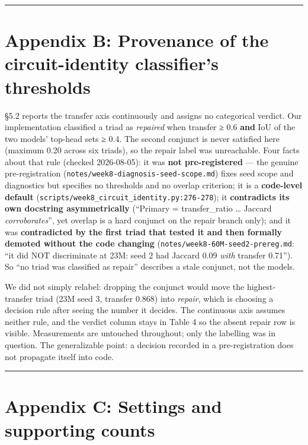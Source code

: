 \documentclass[11pt]{article}
\begin{document}
\begin{center}\rule{0.5\linewidth}{0.5pt}\end{center}

\section{Appendix B: Provenance of the circuit-identity classifier's thresholds}\label{appendix-b-provenance-of-the-circuit-identity-classifiers-thresholds}

§5.2 reports the transfer axis continuously and assigns no categorical verdict. Our
implementation classified a triad as \emph{repaired} when transfer ≥ 0.6 \textbf{and} IoU of the two
models' top-head sets ≥ 0.4. The second conjunct is never satisfied here (maximum 0.20
across six triads), so the repair label was unreachable. Four facts about that rule
(checked 2026-08-05): it was \textbf{not pre-registered} — the genuine pre-registration
(\texttt{notes/week8-diagnosis-seed-scope.md}) fixes seed scope and diagnostics but specifies no
thresholds and no overlap criterion; it is a \textbf{code-level default}
(\texttt{scripts/week8\_circuit\_identity.py:276-278}); it \textbf{contradicts its own docstring
asymmetrically} (``Primary = transfer\_ratio \ldots{} Jaccard \emph{corroborates}'', yet overlap is a
hard conjunct on the repair branch only); and it was \textbf{contradicted by the first triad that
tested it and then formally demoted without the code changing}
(\texttt{notes/week8-60M-seed2-prereg.md}: ``it did NOT discriminate at 23M: seed 2 had Jaccard
0.09 \emph{with} transfer 0.71''). So ``no triad was classified as repair'' describes a stale
conjunct, not the models.

We did not simply relabel: dropping the conjunct would move the highest-transfer triad
(23M seed 3, transfer 0.868) into \emph{repair}, which is choosing a decision rule after seeing
the number it decides. The continuous axis assumes neither rule, and the verdict column
stays in Table 4 so the absent repair row is visible. Measurements are untouched
throughout; only the labelling was in question. The generalizable point: a decision
recorded in a pre-registration does not propagate itself into code.

\begin{center}\rule{0.5\linewidth}{0.5pt}\end{center}

\section{Appendix C: Settings and supporting counts}\label{appendix-c-settings-and-supporting-counts}
\end{document}
